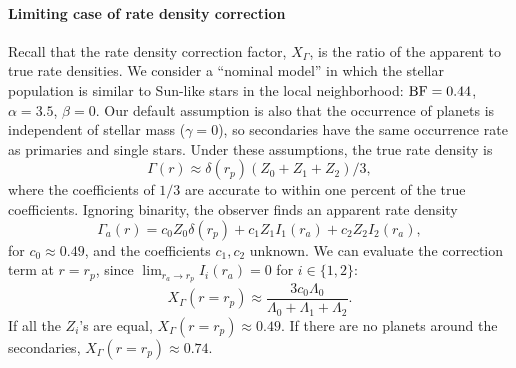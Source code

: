 \paragraph{Limiting case of rate density correction}
Recall that the rate density correction factor, $X_\Gamma$, is the ratio of 
the apparent to true rate densities.
We consider a ``nominal model'' in which the stellar population is similar to 
Sun-like stars in the local neighborhood:
${\rm BF}=0.44$, $\alpha=3.5$, $\beta=0$.
Our default assumption is also that the occurrence of planets is independent 
of stellar mass ($\gamma=0$), so secondaries have the same occurrence rate as 
primaries and single stars.
Under these assumptions, the true rate density is
\begin{equation}
\Gamma(r) \approx \delta(r_p) \left( Z_0 + Z_1 + 
Z_2 \right) / 3,
\label{eq:model2_Gamma_r}
\end{equation}
where the coefficients of $1/3$ are accurate to within one percent of the true 
coefficients.
Ignoring binarity, the observer finds an apparent rate density
\begin{equation}
\Gamma_a(r) = c_0 Z_0 \delta(r_p)
             +c_1 Z_1 I_1(r_a)
             +c_2 Z_2 I_2(r_a),
\label{eq:model2_Gamma_a_r}
\end{equation}
for $c_0\approx 0.49$, and the coefficients $c_1, c_2$ unknown.
We can evaluate the correction term at $r=r_p$, since $\lim_{r_a\rightarrow 
r_p} I_i(r_a)=0$ for $i\in\{1,2\}$:
\begin{equation}
X_\Gamma(r=r_p) \approx \frac{3c_0 \Lambda_0}{\Lambda_0+\Lambda_1+\Lambda_2}.
\end{equation}
If all the $Z_i$'s are equal, $X_\Gamma(r=r_p)\approx0.49$.
If there are no planets around the secondaries, $X_\Gamma(r=r_p)\approx0.74$.

